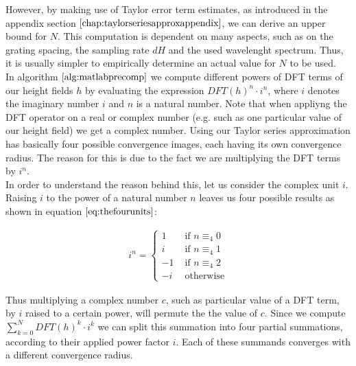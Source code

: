 However, by making use of Taylor error term estimates, as introduced in the appendix section $\ref{chap:taylorseriesapproxappendix}$, we can derive an upper bound for $N$. This computation is dependent on many aspects, such as on the grating spacing, the sampling rate $dH$ and the used wavelenght spectrum. Thus, it is usually simpler to empirically determine an actual value for $N$ to be used. \\

In algorithm $\ref{alg:matlabprecomp}$ we compute different powers of DFT terms of our height fields $h$ by evaluating the expression $DFT(h)^n \cdot i^n$, where $i$ denotes the imaginary number $i$ and $n$ is a natural number. Note that when appliyng the DFT operator on a real or complex number (e.g. such as one particular value of our height field) we get a complex number. Using our Taylor series approximation has basically four possible convergence images, each having its own convergence radius. The reason for this is due to the fact we are multiplying the DFT terms by $i^n$. \\

In order to understand the reason behind this, let us consider the complex unit $i$. Raising $i$ to the power of a natural number $n$ leaves us four possible results as shown in equation $\ref{eq:thefourunits}$:
 
\begin{align}
  i^n = \left\{ \begin{array}{rl}
  1 &\mbox{ if $n \equiv_4 0$} \\
  i &\mbox{ if $n \equiv_4 1$} \\
  -1 &\mbox{ if $n \equiv_4 2$} \\
  -i &\mbox{ otherwise}
  \end{array} \right.
\label{eq:thefourunits}
\end{align}

Thus multiplying a complex number $c$, such as particular value of a DFT term, by $i$ raised to a certain power, will permute the the value of $c$.
Since we compute $\sum_{k=0}^N DFT(h)^k \cdot i^k$ we can split this summation into four partial summations, according to their applied power factor $i$. Each of these summands converges with a different convergence radius.

